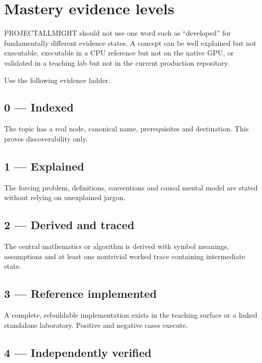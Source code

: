 \hypertarget{appendix-2a2e5bd7143a}{}
\section{Mastery evidence levels}\label{appendix-2a2e5bd7143a-mastery-evidence-levels}

PROJECTALLMIGHT should not use one word such as ``developed'' for fundamentally different evidence states. A concept can be well explained but not executable, executable in a CPU reference but not on the native GPU, or validated in a teaching lab but not in the current production repository.

Use the following evidence ladder.

\subsection{0 --- Indexed}\label{appendix-2a2e5bd7143a-indexed}

The topic has a real node, canonical name, prerequisites and destination. This proves discoverability only.

\subsection{1 --- Explained}\label{appendix-2a2e5bd7143a-explained}

The forcing problem, definitions, conventions and causal mental model are stated without relying on unexplained jargon.

\subsection{2 --- Derived and traced}\label{appendix-2a2e5bd7143a-derived-and-traced}

The central mathematics or algorithm is derived with symbol meanings, assumptions and at least one nontrivial worked trace containing intermediate state.

\subsection{3 --- Reference implemented}\label{appendix-2a2e5bd7143a-reference-implemented}

A complete, rebuildable implementation exists in the teaching surface or a linked standalone laboratory. Positive and negative cases execute.

\subsection{4 --- Independently verified}\label{appendix-2a2e5bd7143a-independently-verified}

